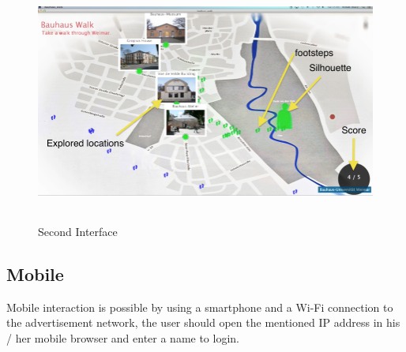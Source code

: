 \begin{enumerate}
\begin{figure}[H]
    \centering
    \includegraphics[width=130mm,height=80mm]{Figures/6/body/interaction_inter}
    \caption{Second Interface}%
    \label{fig:body_secondinterface}%
\end{figure}


\end{enumerate}

\subsection{Mobile}
Mobile interaction is possible by using a smartphone and a Wi-Fi connection to the advertisement network, the user should open the mentioned IP address in his / her mobile browser and enter a name to login. 


